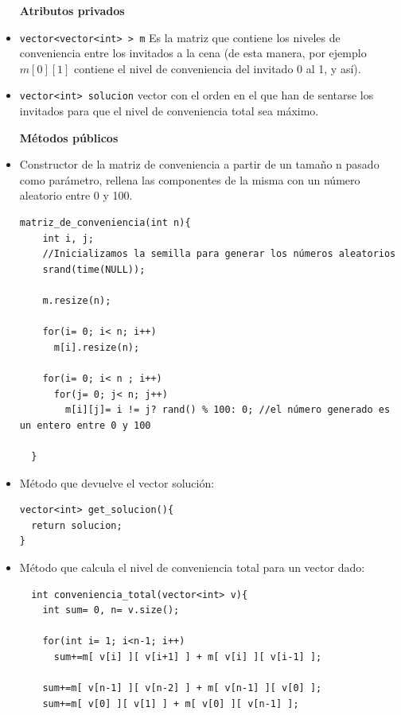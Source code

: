 \documentclass[12pt]{article}
\begin{document}
\begin{itemize}[wide, nosep, labelindent = 0pt, topsep = 1ex]
\item[\textbf{Atributos privados}]
\item \verb|vector<vector<int> > m| Es la matriz que contiene los niveles de conveniencia entre los invitados a la cena (de esta manera, por ejemplo $m[0][1]$ contiene el nivel de conveniencia del invitado 0 al 1, y así).
\item \verb|vector<int> solucion| vector con el orden en el que han de sentarse los invitados para que el nivel de conveniencia total sea máximo.
\end{itemize}
\begin{itemize}[wide, nosep, labelindent = 0pt, topsep = 1ex]
\item[\textbf{Métodos públicos}] 
\item Constructor de la matriz de conveniencia a partir de un tamaño n pasado como parámetro, rellena las componentes de la misma con un número aleatorio entre 0 y 100.
\begin{lstlisting}
matriz_de_conveniencia(int n){
    int i, j;
    //Inicializamos la semilla para generar los números aleatorios
    srand(time(NULL));
  
    m.resize(n);

    for(i= 0; i< n; i++)
      m[i].resize(n);

    for(i= 0; i< n ; i++)
      for(j= 0; j< n; j++)
        m[i][j]= i != j? rand() % 100: 0; //el número generado es un entero entre 0 y 100

  }
\end{lstlisting}

\item Método que devuelve el vector solución:
\begin{lstlisting}
vector<int> get_solucion(){
  return solucion;
}
\end{lstlisting}

\item Método que calcula el nivel de conveniencia total para un vector dado:
\begin{lstlisting}
  int conveniencia_total(vector<int> v){
    int sum= 0, n= v.size();

    for(int i= 1; i<n-1; i++)
      sum+=m[ v[i] ][ v[i+1] ] + m[ v[i] ][ v[i-1] ];

    sum+=m[ v[n-1] ][ v[n-2] ] + m[ v[n-1] ][ v[0] ];
    sum+=m[ v[0] ][ v[1] ] + m[ v[0] ][ v[n-1] ];


\end{lstlisting}
\end{itemize}
\end{document}
